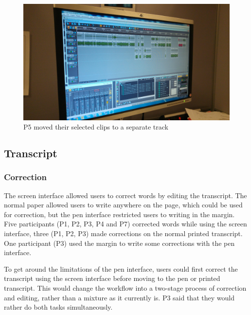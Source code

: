 \begin{figure}[h]
  \centering
  \includegraphics[width=\columnwidth]{figs/pen-screen-p5-lowres.jpg}
  \caption{P5 moved their selected clips to a separate track}
  \label{fig:p5-screen}
\end{figure}


\subsection{Transcript}

\subsubsection{Correction}


The screen interface allowed users to correct words by editing the transcript. The normal paper allowed users to write
anywhere on the page, which could be used for correction, but the pen interface restricted users to writing in the
margin.  Five participants (P1, P2, P3, P4 and P7) corrected words while using the screen interface, three (P1, P2, P3)
made corrections on the normal printed transcript.  One participant (P3) used the margin to write some corrections with
the pen interface.

To get around the limitations of the pen interface, users could first correct the transcript using the screen interface
before moving to the pen or printed transcript.  This would change the workflow into a two-stage process of correction
and editing, rather than a mixture as it currently is. P3 said that they would rather do both tasks simultaneously.

